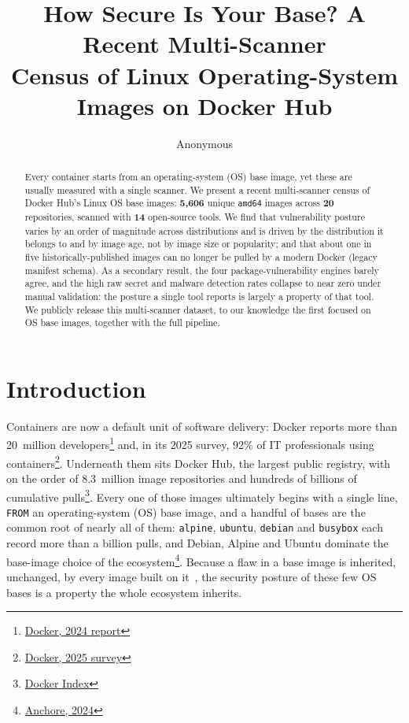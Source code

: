 \documentclass[12pt]{article}
\title{How Secure Is Your Base? A Recent Multi-Scanner\\
Census of Linux Operating-System Images on Docker Hub}
\author{Anonymous}
\begin{document}
\maketitle

\begin{abstract}
Every container starts from an operating-system (OS) base image, yet these are
usually measured with a single scanner. We present a recent multi-scanner
census of Docker Hub's Linux OS base images: \textbf{5{,}606} unique
\texttt{amd64} images across \textbf{20} repositories, scanned with \textbf{14}
open-source tools. We find that vulnerability posture varies by an order of
magnitude across distributions and is driven by the distribution it belongs to and by image age, not by image
size or popularity; and that about one in
five historically-published images can no longer be pulled by a modern Docker
(legacy manifest schema). As a secondary result, the four package-vulnerability
engines barely agree, and the high raw secret and malware detection rates
collapse to near zero under manual validation: the posture a single tool reports
is largely a property of that tool. We publicly release this multi-scanner dataset, to our knowledge
the first focused on OS base images, together with the full pipeline.
\end{abstract}

\section{Introduction}
\label{sec:intro}
Containers are now a default unit of software delivery: Docker reports more
than 20~million developers\footnote{\href{https://www.docker.com/press-release/unveils-2024-state-of-application-development-report/}{Docker, 2024 report}}
and, in its 2025 survey, 92\% of IT professionals using
containers\footnote{\href{https://www.docker.com/blog/2025-docker-state-of-app-dev/}{Docker, 2025 survey}}.
Underneath them sits Docker Hub, the largest public registry, with on the order
of 8.3~million image repositories and hundreds of billions of cumulative
pulls\footnote{\href{https://www.docker.com/blog/docker-index-shows-continued-massive-developer-adoption-and-activity-to-build-and-share-apps-with-docker/}{Docker Index}}. Every one of those images ultimately begins with
a single line, \texttt{FROM} an operating-system (OS) base image, and a
handful of bases are the common root of nearly all of them: \texttt{alpine},
\texttt{ubuntu}, \texttt{debian} and \texttt{busybox} each record more than a
billion pulls, and Debian, Alpine and Ubuntu dominate the base-image choice of
the ecosystem\footnote{\href{https://anchore.com/blog/breakdown-of-operating-systems-of-dockerhub/}{Anchore, 2024}}. Because a flaw in a base image is
inherited, unchanged, by every image built on it~\cite{shu2017dockerhub}, the
security posture of these few OS bases is a property the whole ecosystem
inherits.
\end{document}
